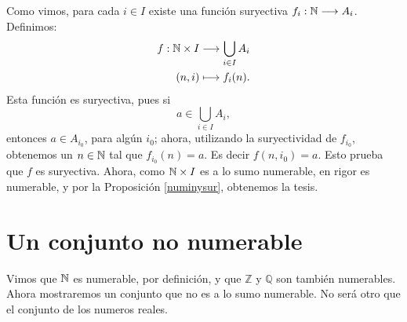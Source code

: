 \begin{demo} Como vimos, para cada $i\in I$ existe una función
suryectiva $f_i:\mathbb{N}\longrightarrow A_i$. Definimos:
\[
\begin{split}
      f:\mathbb{N}\times I & \longrightarrow \bigcup\limits_{i\in I} A_i
      \\
    (n,i) & \longmapsto f_i(n).
         \\
 \end{split}
\]
Esta función es suryectiva, pues si
\[a \in \bigcup\limits_{i\in I} A_i,\]
entonces $a \in A_{i_0} $, para algún $i_0$; 
ahora, utilizando la
suryectividad de $f_{i_0}$, obtenemos un $n \in\mathbb{N}$ tal que
$f_{i_0}(n)=a$. 
Es decir $f(n,i_0)=a$. Esto prueba que $f$  es
suryectiva. Ahora, como $\mathbb{N}\times I$ es a lo sumo numerable, en
rigor es numerable, y por la Proposición \vref{numinysur},
obtenemos la tesis.
\end{demo}


\section{Un conjunto no numerable} 
Vimos que $\mathbb{N}$ es numerable, por definición, y que $\mathbb{Z}$
y $\mathbb{Q}$ son también numerables. Ahora mostraremos un
conjunto que no es a lo sumo numerable. No será otro que el
conjunto de los numeros reales.


